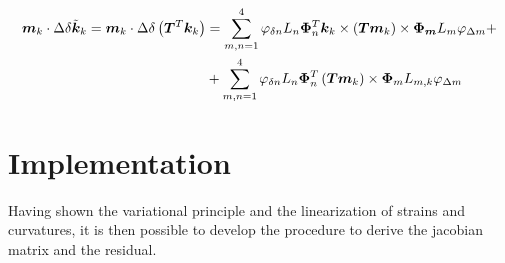 \begin{equation}
\begin{split}
\bm{m}_k \cdot \Delta \delta \tilde{\bm{k}}_k =
\bm{m}_k \cdot \Delta \delta \left( \bm{T}^T \bm{k}_k \right) & =
\sum_{m,n=1}^{4} \varphi_{\delta n} L_n \bm{\Phi}_n^T \bm{k}_k \times \left( \bm{T} \bm{m}_k \right) \times \bm{\Phi_{m}} L_m \varphi_{\Delta m} + \\
&+\sum_{m,n=1}^{4} \varphi_{\delta n} L_n \bm{\Phi}_n^T \left( \bm{T} \bm{m}_k \right) \times \bm{\Phi}_m L_{m,k} \varphi_{\Delta m}
\end{split}
\label{eq:Deltadelta_k}
\end{equation}
\section{Implementation}
Having shown the variational principle and the linearization of strains and curvatures, it is then possible to develop the procedure to derive the jacobian matrix and the residual.
